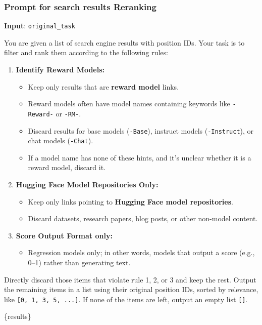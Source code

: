 \subsubsection{Prompt for search results Reranking}  
\label{apd:rerank_prompt}


\begin{tcolorbox}[title = {Search Results Reranking}, breakable, colframe=blue!50!black, colback=blue!10]
\textbf{Input}: \texttt{original\_task}
\tcblower

You are given a list of search engine results with position IDs.  
Your task is to filter and rank them according to the following rules:

\begin{enumerate}
    \item \textbf{Identify Reward Models:}  
    \begin{itemize}
        \item Keep only results that are \textbf{reward model} links.  
        \item Reward models often have model names containing keywords like \texttt{-Reward-} or \texttt{-RM-}.  
        \item Discard results for base models (\texttt{-Base}), instruct models (\texttt{-Instruct}), or chat models (\texttt{-Chat}).  
        \item If a model name has none of these hints, and it's unclear whether it is a reward model, discard it.
    \end{itemize}

    \item \textbf{Hugging Face Model Repositories Only:}  
    \begin{itemize}
        \item Keep only links pointing to \textbf{Hugging Face model repositories}.  
        \item Discard datasets, research papers, blog posts, or other non-model content.
    \end{itemize}

    \item \textbf{Score Output Format only:}
    \begin{itemize}
        \item Regression models only; in other words, models that output a score (e.g., 0--1) rather than generating text.
    \end{itemize}
\end{enumerate}

Directly discard those items that violate rule 1, 2, or 3 and keep the rest. Output the remaining items in a list using their original position IDs, sorted by relevance, like \texttt{[0, 1, 3, 5, ...]}. If none of the items are left, output an empty list \texttt{[]}.

\bigskip
\{results\}

\end{tcolorbox}




